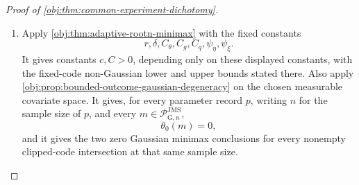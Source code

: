 \begin{proof}[Proof of \cref{obj:thm:common-experiment-dichotomy}]
\begin{enumerate}
\item
Apply \cref{obj:thm:adaptive-rootn-minimax} with the fixed constants
\[
r,\delta,C_{\theta},C_g,C_q,\psi_{\eta},\psi_{\xi}.
\]
It gives constants \(c,C>0\), depending only on these displayed constants, with the fixed-code non-Gaussian lower and upper bounds stated there. Also apply \cref{obj:prop:bounded-outcome-gaussian-degeneracy} on the chosen measurable covariate space. It gives, for every parameter record \(p\), writing \(n\) for the sample size of \(p\), and every \(m\in\mathcal P_{\mathrm G,n}^{\mathrm{JMS}}\),
\[
\theta_0(m)=0,
\]
and it gives the two zero Gaussian minimax conclusions for every nonempty clipped-code intersection at that same sample size.


\end{enumerate}
\end{proof}
